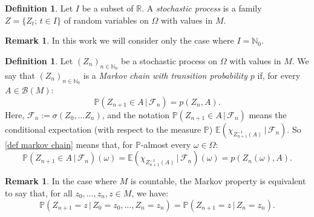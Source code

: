 \documentclass[a4paper]{article}
\theoremstyle{plain}
\theoremstyle{definition}
\newtheorem{defn}[theorem]{Definition}%
\newtheorem{rem}[theorem]{Remark}
\newcommand{\R}{\mathbb{R}}
\newcommand{\N}{\mathbb{N}}
\begin{document}
	\begin{defn}
		Let $I$ be a subset of $\R$. A \textit{stochastic process} is a family $Z = \{Z_{t};\, t \in I\}$ of random variables on $\Omega$ with values in $M$.
	\end{defn}
	
	\begin{rem}
		In this work we will consider only the case where $I = \N_{0}$.
	\end{rem}


	\begin{defn}
		Let $(Z_{n})_{n\in\N_{0}}$ be a stochastic process on $\Omega$ with values in $M$. We say that $(Z_{n})_{n\in\N_{0}}$ is a \textit{Markov chain with transition probability $p$} if, for every $A \in \mathcal{B}(M)$:
		\begin{equation}\label{def markov chain}
			\mathbb{P}(Z_{n+1} \in A \,|\, \mathcal{F}_{n}) = p(Z_{n},A).
		\end{equation}
		Here, $\mathcal{F}_{n} := \sigma(Z_{0},\dots Z_{n})$, and the notation $\mathbb{P}(Z_{n+1} \in A\,|\,\mathcal{F}_{n})$ means the conditional expectation (with respect to the measure $\mathbb{P}$) $\mathbb{E}\left(\chi_{Z_{n+1}^{-1}(A)}\,|\,\mathcal{F}_{n}\right)$. So \eqref{def markov chain} means that, for $\mathbb{P}$-almost every $\omega \in \Omega$:
		\begin{equation*}
			\mathbb{P}\left(Z_{n+1} \in A\,|\,\mathcal{F}_{n}\right)(\omega) = \mathbb{E}\left(\chi_{Z_{n+1}^{-1}(A)}\,|\,\mathcal{F}_{n}\right)(\omega) = p(Z_{n}(\omega),A).
		\end{equation*}
	\end{defn}
	

	\begin{rem}
		In the case where $M$ is countable, the Markov property is equivalent to say that, for all $z_{0}, \dots, z_{n}, z \in M$, we have:
		\begin{equation*}
			\mathbb{P}(Z_{n+1} = z \,|\, Z_{0}=z_{0},\dots,Z_{n}=z_{n}) = \mathbb{P}(Z_{n+1}=z\,|\,Z_{n}=z_{n}).
		\end{equation*}
	\end{rem}


\quad
\end{document}
